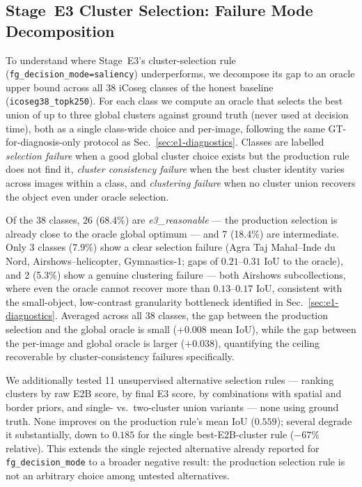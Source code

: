 \subsection{Stage~E3 Cluster Selection: Failure Mode Decomposition}
\label{sec:ablation-e3-selection}

To understand where Stage~E3's cluster-selection rule
(\texttt{fg\_decision\_mode=saliency}) underperforms, we decompose its
gap to an oracle upper bound across all 38 iCoseg classes of the honest
baseline (\texttt{icoseg38\_topk250}). For each class we compute an
oracle that selects the best union of up to three global clusters against
ground truth (never used at decision time), both as a single class-wide
choice and per-image, following the same GT-for-diagnosis-only protocol
as Sec.~\ref{sec:e1-diagnostics}. Classes are labelled \emph{selection
failure} when a good global cluster choice exists but the production rule
does not find it, \emph{cluster consistency failure} when the best cluster
identity varies across images within a class, and \emph{clustering
failure} when no cluster union recovers the object even under oracle
selection.

Of the 38 classes, 26 (68.4\%) are \emph{e3\_reasonable} --- the production
selection is already close to the oracle global optimum --- and 7 (18.4\%)
are intermediate. Only 3 classes (7.9\%) show a clear selection failure
(Agra Taj Mahal--Inde du Nord, Airshows--helicopter, Gymnastics-1; gaps of
$0.21$--$0.31$ IoU to the oracle), and 2 (5.3\%) show a genuine clustering
failure --- both Airshows subcollections, where even the oracle cannot
recover more than $0.13$--$0.17$ IoU, consistent with the small-object,
low-contrast granularity bottleneck identified in
Sec.~\ref{sec:e1-diagnostics}. Averaged across all 38 classes, the gap
between the production selection and the global oracle is small
($+0.008$ mean IoU), while the gap between the per-image and global
oracle is larger ($+0.038$), quantifying the ceiling recoverable by
cluster-consistency failures specifically.

We additionally tested 11 unsupervised alternative selection rules ---
ranking clusters by raw E2B score, by final E3 score, by combinations
with spatial and border priors, and single- vs.\ two-cluster union
variants --- none using ground truth. None improves on the production
rule's mean IoU ($0.559$); several degrade it substantially, down to
$0.185$ for the single best-E2B-cluster rule ($-67\%$ relative). This
extends the single rejected alternative already reported for
\texttt{fg\_decision\_mode} to a broader negative result: the production
selection rule is not an arbitrary choice among untested alternatives.

